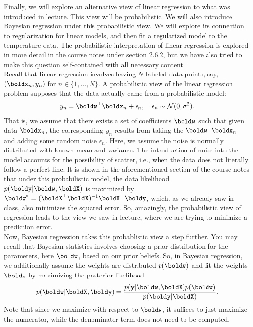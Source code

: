 \documentclass[submit]{../harvardml}
\begin{document}
\begin{problem}
    Finally, we will explore an alternative view of linear regression to what was introduced in lecture. This view will be probabilistic. We will also introduce Bayesian regression under this probabilistic view. We will explore its connection to regularization for linear models, and then fit a regularized model to the temperature data. The probabilistic interpretation of linear regression is explored in more detail in the \href{https://github.com/harvard-ml-courses/cs181-textbook/blob/master/Textbook.pdf}{course notes} under section 2.6.2, but we have also tried to make this question self-contained with all necessary content.
    \\

    \noindent Recall that linear regression involves having $N$ labeled data points, say, $(\boldx_n,y_n)$ for $n\in\{1,\dots,N\}$. A probabilistic view of the linear regression problem supposes that the data actually came from a probabilistic model:
    \[y_n = \boldw^\top\boldx_n + \epsilon_n, \quad \epsilon_n \sim \mathcal{N}(0, \sigma^2).\]
    That is, we assume that there exists a set of coefficients $\boldw$ such that given data $\boldx_n$, the corresponding $y_n$ results from taking the $\boldw^\top\boldx_n$ and adding some random noise $\epsilon_n$. Here, we assume the noise is normally distributed with known mean and variance. The introduction of noise into the model accounts for the possibility of scatter, i.e., when the data does not literally follow a perfect line. It is shown in the aforementioned section of the course notes that under this probabilistic model, the data likelihood $p(\boldy|\boldw,\boldX)$ is maximized by $\boldw^* = (\boldX^\top\boldX)^{-1} \boldX^\top \boldy$, which, as we already saw in class, also minimizes the squared error. So, amazingly, the probabilistic view of regression leads to the view we saw in lecture, where we are trying to minimize a prediction error. \\

    \noindent Now, Bayesian regression takes this probablistic view a step further. You may recall that Bayesian statistics involves choosing a prior distribution for the parameters, here $\boldw$, based on our prior beliefs. So, in Bayesian regression, we additionally assume the weights are distributed $p(\boldw)$ and fit the weights $\boldw$ by maximizing the posterior likelihood
    \[ p(\boldw | \boldX, \boldy) = \frac{p(\bold y | \boldw, \boldX)p(\boldw)}{p(\boldy | \boldX)}. \]
    Note that since we maximize with respect to $\boldw$, it suffices to just maximize the numerator, while the denominator term does not need to be computed.


\end{problem}
\end{document}

